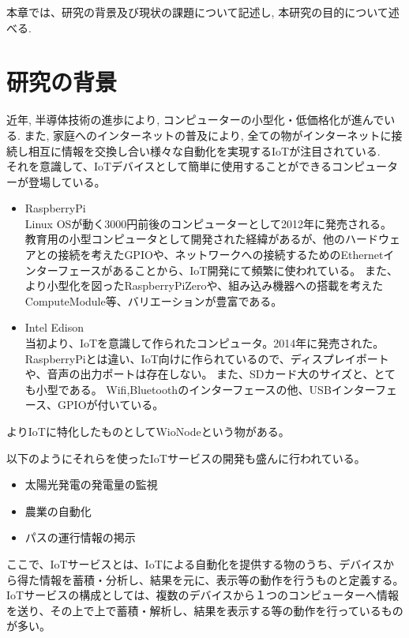本章では、研究の背景及び現状の課題について記述し, 本研究の目的について述べる.

\section{研究の背景}
近年, 半導体技術の進歩により, コンピューターの小型化・低価格化が進んでいる. 
また, 家庭へのインターネットの普及により, 全ての物がインターネットに接続し相互に情報を交換し合い様々な自動化を実現するIoTが注目されている.\\

それを意識して、IoTデバイスとして簡単に使用することができるコンピューターが登場している。
\begin{itemize}
\item RaspberryPi\\
	Linux OSが動く3000円前後のコンピューターとして2012年に発売される。
	教育用の小型コンピュータとして開発された経緯があるが、他のハードウェアとの接続を考えたGPIOや、ネットワークへの接続するためのEthernetインターフェースがあることから、IoT開発にて頻繁に使われている。
	また、より小型化を図ったRaspberryPiZeroや、組み込み機器への搭載を考えたComputeModule等、バリエーションが豊富である。
\item Intel Edison\\
	当初より、IoTを意識して作られたコンピュータ。2014年に発売された。
	RaspberryPiとは違い、IoT向けに作られているので、ディスプレイポートや、音声の出力ポートは存在しない。
	また、SDカード大のサイズと、とても小型である。
	Wifi,Bluetoothのインターフェースの他、USBインターフェース、GPIOが付いている。
\end{itemize}
よりIoTに特化したものとしてWioNodeという物がある。


\begin{comment}
最近ではWioNodeという物も出てきている。
ESP-WROOM-02 の登場
Ardiuno
beaglebone
\end{comment}

以下のようにそれらを使ったIoTサービスの開発も盛んに行われている。
\begin{itemize}
\item 太陽光発電の発電量の監視
\item 農業の自動化
\item パスの運行情報の掲示
\end{itemize}

ここで、IoTサービスとは、IoTによる自動化を提供する物のうち、デバイスから得た情報を蓄積・分析し、結果を元に、表示等の動作を行うものと定義する。
IoTサービスの構成としては、複数のデバイスから１つのコンピューターへ情報を送り、その上で上で蓄積・解析し、結果を表示する等の動作を行っているものが多い。

